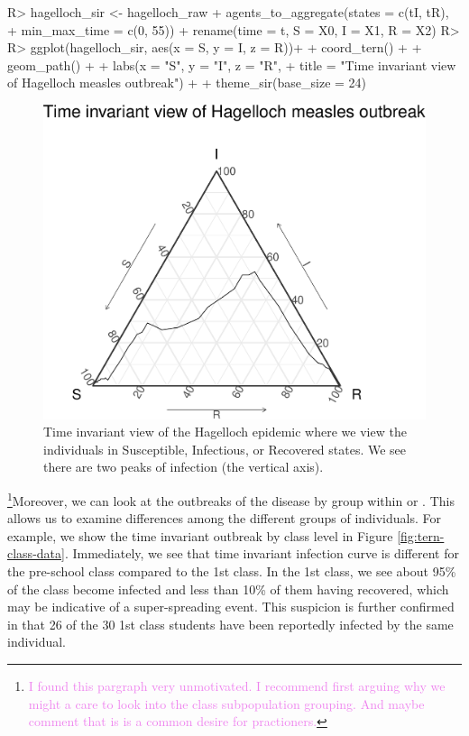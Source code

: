 \documentclass[
  shortnames]{jss}
\begin{document}
\begin{CodeChunk}
\begin{CodeInput}
R> hagelloch_sir <- hagelloch_raw %
+   agents_to_aggregate(states = c(tI, tR),
+                       min_max_time = c(0, 55)) %
+   rename(time = t, S = X0, I = X1, R = X2)
R> 
R> ggplot(hagelloch_sir, aes(x = S, y = I, z = R))+
+   coord_tern() +
+   geom_path() +
+   labs(x = "S", y = "I", z = "R",
+        title = "Time invariant view of Hagelloch measles outbreak") + 
+   theme_sir(base_size = 24)
\end{CodeInput}
\begin{figure}[H]

{\centering \includegraphics{Figs/unnamed-chunk-24-1} 

}

\caption{\label{fig:hag-tern-raw}Time invariant view of the Hagelloch epidemic where we view the individuals in Susceptible, Infectious, or Recovered states.  We see there are two peaks of infection (the vertical axis).}\label{fig:unnamed-chunk-24}
\end{figure}
\end{CodeChunk}

\footnote{\textcolor{violet}{I found this pargraph very unmotivated. I recommend first arguing why we might a care to look into the class subpopulation grouping. And maybe comment that is is a common desire for practioners.}}Moreover,
we can look at the outbreaks of the disease by group within
 or . This allows us
to examine differences among the different groups of individuals. For
example, we show the time invariant outbreak by class level in Figure
\ref{fig:tern-class-data}. Immediately, we see that time invariant
infection curve is different for the pre-school class compared to the
1st class. In the 1st class, we see about 95\% of the class become
infected and less than 10\% of them having recovered, which may be
indicative of a super-spreading event. This suspicion is further
confirmed in that 26 of the 30 1st class students have been reportedly
infected by the same individual.
\end{document}
